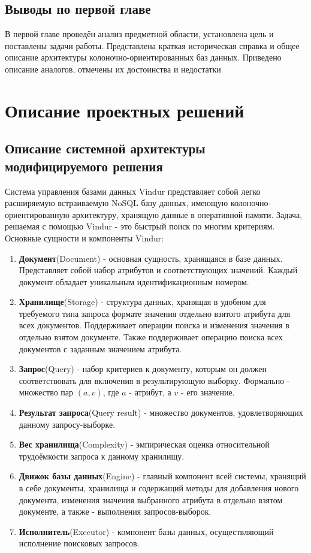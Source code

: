 \documentclass{matmex-diploma}
\begin{document}
    \subsection{Выводы по первой главе}
        В первой главе проведён анализ предметной области, установлена цель и поставлены задачи работы. Представлена краткая историческая справка и общее описание архитектуры колоночно-ориентированных баз данных. Приведено описание аналогов, отмечены их достоинства и недостатки
    
    
\section{Описание проектных решений}
    \subsection{Описание системной архитектуры модифицируемого решения}
    Система управления базами данных Vindur представляет собой легко расширяемую встраиваемую NoSQL базу данных, имеющую колоночно-ориентированную архитектуру, хранящую данные в оперативной памяти. Задача, решаемая с помощью Vindur - это быстрый поиск по многим критериям. 
    Основные сущности и компоненты Vindur:
        \begin{enumerate}
            \item \textbf{Документ}(Document) - основная сущность, хранящаяся в базе данных. Представляет собой набор атрибутов и соответствующих значений. Каждый документ обладает уникальным идентификационным номером.                 
            \item \textbf{Хранилище}(Storage) - структура данных, хранящая в удобном для требуемого типа запроса формате значения отдельно взятого атрибута для всех документов. Поддерживает операции поиска и изменения значения в отдельно взятом документе. Также поддерживает операцию поиска всех документов с заданным значением атрибута.
            \item \textbf{Запрос}(Query) - набор критериев к документу, которым он должен соответствовать для включения в результирующую выборку. Формально - множество пар $(a, v)$, где $a$ - атрибут, а $v$ - его значение. 
            \item \textbf{Результат запроса}(Query result) - множество документов, удовлетворяющих данному запросу-выборке.
            \item \textbf{Вес хранилища}(Complexity) - эмпирическая оценка относительной трудоёмкости запроса к данному хранилищу.
            \item \textbf{Движок базы данных}(Engine) - главный компонент всей системы, хранящий в себе документы, хранилища и содержащий методы для добавления нового документа, изменения значения выбранного атрибута в отдельно взятом документе, а также - выполнения запросов-выборок.
            \item \textbf{Исполнитель}(Executor) - компонент базы данных, осуществляющий исполнение поисковых запросов.
        \end{enumerate}
    
\end{document}
